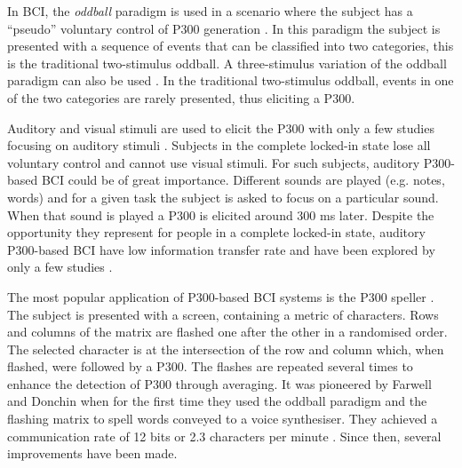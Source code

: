 In BCI, the \emph{oddball} paradigm is used in a scenario where the subject has a ``pseudo'' voluntary control of P300 generation \citep{ritter_averaged_1969}.  
In this paradigm the subject is presented with a sequence of events that can be classified into two categories, this is the traditional two-stimulus oddball. 
A three-stimulus variation of the oddball paradigm can also be used \citep{polich_updating_2007}. 
In the traditional two-stimulus oddball, events in one of the two categories are rarely presented, thus eliciting a P300. 
\par
Auditory and visual stimuli are used to elicit the P300 with only a few studies focusing on auditory stimuli \citep{elshout_review_2009}. 
Subjects in the complete locked-in state lose all voluntary control and cannot use visual stimuli. 
For such subjects, auditory P300-based BCI could be of great importance. 
Different sounds are played (e.g. notes, words) and for a given task the subject is asked to focus on a particular sound. 
When that sound is played a P300 is elicited around 300 ms later. 
Despite the opportunity they represent for people in a complete locked-in state, auditory P300-based BCI have low information transfer rate and have been explored by only a few studies \citep{sellers_p300_2006, elshout_review_2009, kathner_portable_2013, kaufmann_face_2013}.

\par
The most popular application of P300-based BCI systems is the P300 speller \citep{farwell_talking_1988}. 
The subject is presented with a screen, containing a metric of characters. %
Rows and columns of the matrix are flashed one after the other in a randomised order. 
The selected character is at the intersection of the row and column which, when flashed, were followed by a P300.
The flashes are repeated several times to enhance the detection of P300 through averaging.
It was pioneered by Farwell and Donchin when for the first time they used the oddball paradigm and the flashing matrix to spell words conveyed to a voice synthesiser. They achieved a communication rate of 12 bits or 2.3 characters per minute \citep{farwell_talking_1988}.
Since then, several improvements have been made. 


